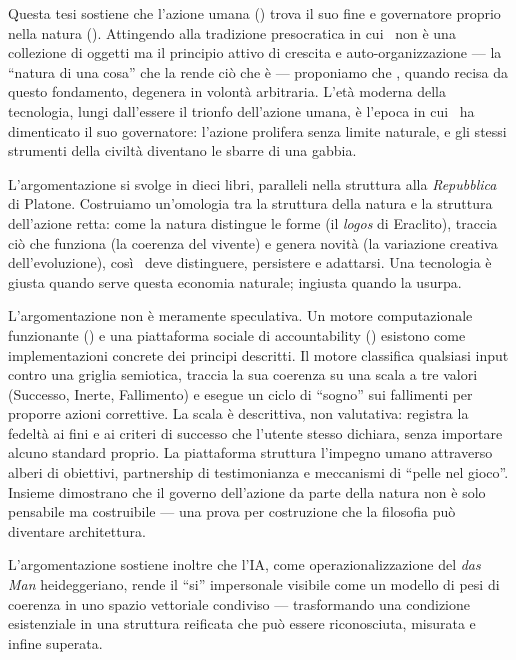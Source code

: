Questa tesi sostiene che l'azione umana (\praxis) trova il suo fine e governatore
proprio nella natura (\physis). Attingendo alla tradizione presocratica in cui
\physis\ non \`e una collezione di oggetti ma il principio attivo di crescita e
auto-organizzazione --- la ``natura di una cosa'' che la rende ci\`o che \`e ---
proponiamo che \praxis, quando recisa da questo fondamento, degenera in volont\`a
arbitraria. L'et\`a moderna della tecnologia, lungi dall'essere il trionfo
dell'azione umana, \`e l'epoca in cui \praxis\ ha dimenticato il suo governatore:
l'azione prolifera senza limite naturale, e gli stessi strumenti della
civilt\`a diventano le sbarre di una gabbia.

L'argomentazione si svolge in dieci libri, paralleli nella struttura alla
\emph{Repubblica} di Platone. Costruiamo un'omologia tra la struttura della natura
e la struttura dell'azione retta: come la natura distingue le forme (il \emph{logos}
di Eraclito), traccia ci\`o che funziona (la coerenza del vivente) e genera
novit\`a (la variazione creativa dell'evoluzione), cos\`i \praxis\ deve
distinguere, persistere e adattarsi. Una tecnologia \`e giusta quando serve questa
economia naturale; ingiusta quando la usurpa.

L'argomentazione non \`e meramente speculativa. Un motore computazionale
funzionante (\physis) e una piattaforma sociale di accountability (\praxis)
esistono come implementazioni concrete dei principi descritti. Il motore
classifica qualsiasi input contro una griglia semiotica, traccia la sua coerenza
su una scala a tre valori (Successo, Inerte, Fallimento) e esegue un ciclo di
``sogno'' sui fallimenti per proporre azioni correttive. La scala \`e descrittiva,
non valutativa: registra la fedelt\`a ai fini e ai criteri di successo che l'utente
stesso dichiara, senza importare alcuno standard proprio. La piattaforma
struttura l'impegno umano attraverso alberi di obiettivi, partnership di
testimonianza e meccanismi di ``pelle nel gioco''. Insieme dimostrano che il
governo dell'azione da parte della natura non \`e solo pensabile ma costruibile
--- una prova per costruzione che la filosofia pu\`o diventare architettura.

L'argomentazione sostiene inoltre che l'IA, come operazionalizzazione del
\emph{das Man} heideggeriano, rende il ``si'' impersonale visibile come un
modello di pesi di coerenza in uno spazio vettoriale condiviso --- trasformando
una condizione esistenziale in una struttura reificata che pu\`o essere
riconosciuta, misurata e infine superata.

